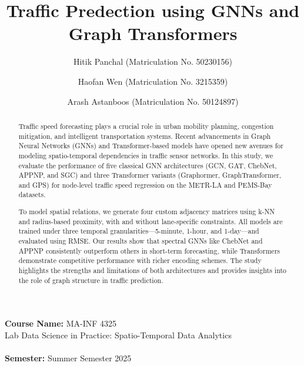 \documentclass[runningheads]{llncs}
\begin{document}
\title{Traffic Predection using GNNs and Graph Transformers}
\author{Hitik Panchal (Matriculation No. 50230156)\and Haofan Wen (Matriculation No. 3215359)\and Arash Astanboos (Matriculation No. 50124897)}
\authorrunning{ }

\maketitle

\vspace{1em}
{\noindent\textbf{Course Name:} MA-INF 4325 \\  Lab Data Science in Practice: Spatio-Temporal Data Analytics \\
\\ \textbf{Semester:} Summer Semester 2025}

\vspace{1em}
\begin{abstract}
Traffic speed forecasting plays a crucial role in urban mobility planning, congestion mitigation, and intelligent transportation systems. Recent advancements in Graph Neural Networks (GNNs) and Transformer-based models have opened new avenues for modeling spatio-temporal dependencies in traffic sensor networks. In this study, we evaluate the performance of five classical GNN architectures (GCN, GAT, ChebNet, APPNP, and SGC) and three Transformer variants (Graphormer, GraphTransformer, and GPS) for node-level traffic speed regression on the METR-LA and PEMS-Bay datasets.

To model spatial relations, we generate four custom adjacency matrices using k-NN and radius-based proximity, with and without lane-specific constraints. All models are trained under three temporal granularities—5-minute, 1-hour, and 1-day—and evaluated using RMSE. Our results show that spectral GNNs like ChebNet and APPNP consistently outperform others in short-term forecasting, while Transformers demonstrate competitive performance with richer encoding schemes. The study highlights the strengths and limitations of both architectures and provides insights into the role of graph structure in traffic prediction.


\end{abstract}
\end{document}
